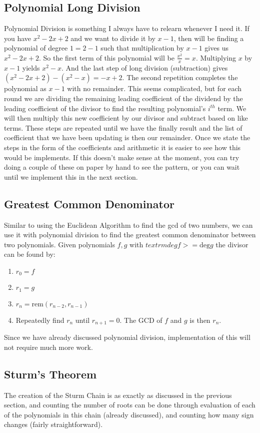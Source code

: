 \documentclass[]{article}
\theoremstyle{definition}
\begin{document}
\subsection{Polynomial Long Division}
Polynomial Division is something I always have to relearn whenever I need it. If you have $x^2 - 2x + 2$ and we want to divide it by $x - 1$, then will be finding a polynomial of degree $1 = 2 - 1$ such that multiplication by $x - 1$ gives us $x^2 - 2x + 2$. So the first term of this polynomial will be $\frac{x^2}{x} = x$. Multiplying $x$ by $x-1$ yields $x^2 - x$. And the last step of long division (subtraction) gives $(x^2 -2x +2) - (x^2 -x) = -x + 2$. The second repetition completes the polynomial as $x - 1$ with no remainder. This seems complicated, but for each round we are dividing the remaining leading coefficient of the dividend by the leading coefficient of the divisor to find the resulting polynomial's $i^{th}$ term. We will then multiply this new coefficient by our divisor and subtract based on like terms. These steps are repeated until we have the finally result and the list of coefficient that we have been updating is then our remainder. Once we state the steps in the form of the coefficients and arithmetic it is easier to see how this would be implements. If this doesn't make sense at the moment, you can try doing a couple of these on paper by hand to see the pattern, or you can wait until we implement this in the next section. 

\subsection{Greatest Common Denominator}
Similar to using the Euclidean Algorithm to find the gcd of two numbers, we can use it with polynomial division to find the greatest common denominator between two polynomials. Given polynomials $f, g$ with $textrm{deg} f >= \textrm{deg} g$ the divisor can be found by:
\begin{enumerate}
	\item $r_0 = f$
	\item $r_1 = g$
	\item $r_{n} = \textrm{rem} (r_{n - 2}, r_{n -1})$
	\item Repeatedly find $r_n$ until $r_{n+1} = 0$. The GCD of $f$ and $g$ is then $r_n$.
\end{enumerate}
Since we have already discussed polynomial division, implementation of this will not require much more work.

\subsection{Sturm's Theorem}
The creation of the Sturm Chain is as exactly as discussed in the previous section, and counting the number of roots can be done through evaluation of each of the polynomials in this chain (already discussed), and counting how many sign changes (fairly straightforward). 
\end{document}
